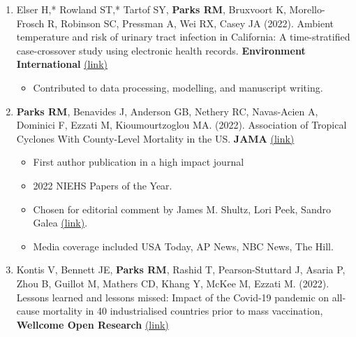 \begin{enumerate}
    \item Elser H,* Rowland ST,* Tartof SY, \textbf{Parks RM}, Bruxvoort K, Morello-Frosch R, Robinson SC, Pressman A, Wei RX, Casey JA (2022). Ambient temperature and risk of urinary tract infection in California: A time-stratified case-crossover study using electronic health records. \textbf{Environment International} \href{https://www.sciencedirect.com/science/article/pii/S0160412022002306}{(link)}

    \begin{itemize}
        \item Contributed to data processing, modelling, and manuscript writing.
    \end{itemize}

\newpage

     \item \textbf{Parks RM}, Benavides J, Anderson GB, Nethery RC, Navas-Acien A, Dominici F, Ezzati M, Kioumourtzoglou MA. (2022). Association of Tropical Cyclones With County-Level Mortality in the US. \textbf{JAMA} \href{https://jamanetwork.com/journals/jama/fullarticle/2789661}{(link)} 

    \begin{itemize}
        \item First author publication in a high impact journal
        \item 2022 NIEHS Papers of the Year. 
        \item Chosen for editorial comment by James M. Shultz, Lori Peek, Sandro Galea \href{https://jamanetwork.com/journals/jama/fullarticle/2789676}{(link)}.
        \item Media coverage included USA Today, AP News, NBC News, The Hill.
    \end{itemize}

    \item Kontis V, Bennett JE, \textbf{Parks RM}, Rashid T, Pearson-Stuttard J, Asaria P, Zhou B, Guillot M, Mathers CD, Khang Y, McKee M, Ezzati M. (2022). Lessons learned and lessons missed: Impact of the Covid-19 pandemic on all-cause mortality in 40 industrialised countries prior to mass vaccination, \textbf{Wellcome Open Research} \href{https://wellcomeopenresearch.org/articles/6-279/v2}{(link)}


\end{enumerate}
